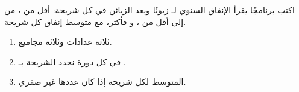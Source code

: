 \begin{statement}
اكتب برنامجًا يقرأ الإنفاق السنوي لـ  زبونًا ويعد الزبائن في كل شريحة: أقل من ، من  إلى أقل من ، و فأكثر، مع متوسط إنفاق كل شريحة.
\end{statement}
\begin{stepsbox}\begin{enumerate}
\item ثلاثة عدادات وثلاثة مجاميع.
\item في كل دورة نحدد الشريحة بـ .
\item المتوسط لكل شريحة إذا كان عددها غير صفري.
\end{enumerate}\end{stepsbox}
